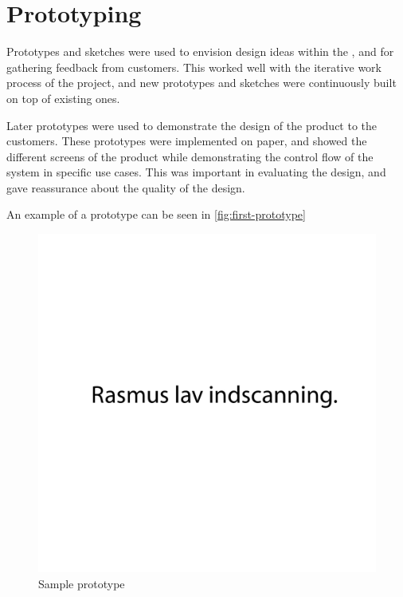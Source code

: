 \section{Prototyping}
Prototypes and sketches were used to envision design ideas within the \localgroup{}, and for gathering feedback from customers. 
This worked well with the iterative work process of the project, and new prototypes and sketches were continuously built on top of existing ones.

Later prototypes were used to demonstrate the design of the product to the customers. 
These prototypes were implemented on paper, and showed the different screens of the product while demonstrating the control flow of the system in specific use cases. 
This was important in evaluating the design, and gave reassurance about the quality of the design. 

An example of a prototype can be seen in \autoref{fig:first-prototype}

\begin{figure}[h!]
	\centering
	\includegraphics[scale=0.5]{gfx/first-prototype.pdf}
	\caption{Sample prototype}
	\label{fig:first-prototype}
\end{figure}